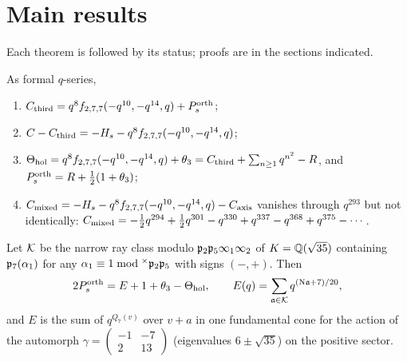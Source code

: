 \section{Main results}\label{sec:main}
Each theorem is followed by its status; proofs are in the sections indicated.

\begin{theorem}\label{thm:A}
As formal $q$-series,
\begin{enumerate}[label=(\roman*)]
\item $C_{\mathrm{third}}=q^8f_{2,7,7}(-q^{10},-q^{14},q)+P^{\mathrm{orth}}_s$;
\item $C-C_{\mathrm{third}}=-H_s-q^8f_{2,7,7}(-q^{10},-q^{14},q)$;
\item $\Theta_{\mathrm{hol}}=q^8f_{2,7,7}(-q^{10},-q^{14},q)+\theta_3=C_{\mathrm{third}}+\sum_{n\ge1}q^{n^2}-R$, and $P^{\mathrm{orth}}_s=R+\tfrac12(1+\theta_3)$;
\item $C_{\mathrm{mixed}}=-H_s-q^8f_{2,7,7}(-q^{10},-q^{14},q)-C_{\mathrm{axis}}$ vanishes through $q^{293}$ but not identically:
$C_{\mathrm{mixed}}=-\tfrac12q^{294}+\tfrac12q^{301}-q^{330}+q^{337}-q^{368}+q^{375}-\cdots$.
\end{enumerate}
\end{theorem}

\begin{theorem}\label{thm:B}
Let $\mathcal{K}$ be the narrow ray class modulo $\mathfrak{p}_2\mathfrak{p}_5\infty_1\infty_2$ of $K=\mathbb{Q}(\sqrt{35})$ containing
$\mathfrak{p}_7(\alpha_1)$ for any $\alpha_1\equiv1\bmod^\times\mathfrak{p}_2\mathfrak{p}_5$ with signs $(-,+)$. Then
\[
2P^{\mathrm{orth}}_s=E+1+\theta_3-\Theta_{\mathrm{hol}},\qquad E(q)=\sum_{\mathfrak{a}\in\mathcal{K}}q^{(\mathrm{N}\mathfrak{a}+7)/20},
\]
and $E$ is the sum of $q^{Q_7(v)}$ over $v+a$ in one fundamental cone for the action of the automorph
$\gamma=\begin{pmatrix}-1&-7\\2&13\end{pmatrix}$ (eigenvalues $6\pm\sqrt{35}$) on the positive sector.
\end{theorem}

